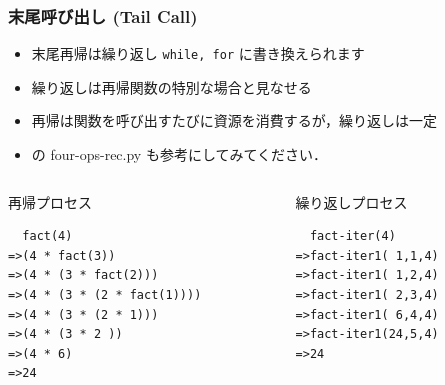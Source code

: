 \begin{frame}[fragile]
\frametitle{末尾呼び出し (Tail Call)}
  \begin{itemize}
\item 末尾再帰は繰り返し {\tt while, for} に書き換えられます
\item 繰り返しは再帰関数の特別な場合と見なせる
\item 再帰は関数を呼び出すたびに資源を消費するが，繰り返しは一定
\item \href{https://sites.google.com/presystems.xyz/elementaryCS/}{} 
の four-ops-rec.py も参考にしてみてください．
  \end{itemize}
  \begin{columns}
    \begin{column}{0.5\textwidth}
      \begin{itembox}{再帰プロセス}
\scriptsize
        \begin{verbatim}
  fact(4)
=>(4 * fact(3))
=>(4 * (3 * fact(2)))
=>(4 * (3 * (2 * fact(1))))
=>(4 * (3 * (2 * 1)))
=>(4 * (3 * 2 ))
=>(4 * 6)
=>24
        \end{verbatim}
      \end{itembox}
    \end{column}
    \begin{column}{0.45\textwidth}
      \begin{itembox}{繰り返しプロセス}
\scriptsize
        \begin{verbatim}
  fact-iter(4)
=>fact-iter1( 1,1,4)
=>fact-iter1( 1,2,4)
=>fact-iter1( 2,3,4)
=>fact-iter1( 6,4,4)
=>fact-iter1(24,5,4)
=>24
        \end{verbatim}
      \end{itembox}
    \end{column}
  \end{columns}
\end{frame}
%
%
